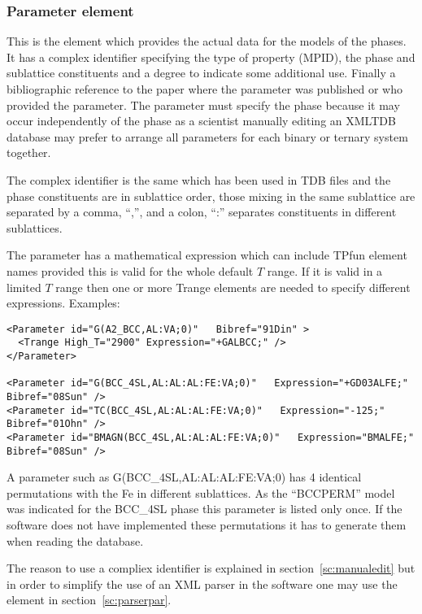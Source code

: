 \documentclass[12pt]{article}
\begin{document}
\begin{appendices}
\subsubsection{Parameter element}\label{sc:parameter}

This is the element which provides the actual data for the models of
the phases.  It has a complex identifier specifying the type of
property (MPID), the phase and sublattice constituents and a degree to
indicate some additional use.  Finally a bibliographic reference to
the paper where the parameter was published or who provided the
parameter.  The parameter must specify the phase because it may occur
independently of the phase as a scientist manually editing an XMLTDB
database may prefer to arrange all parameters for each binary or
ternary system together.

The complex identifier is the same which has been used in TDB files
and the phase constituents are in sublattice order, those mixing in
the same sublattice are separated by a comma, ``,'', and a colon,
``:'' separates constituents in different sublattices.

The parameter has a mathematical expression which can include TPfun
element names provided this is valid for the whole default $T$ range.
If it is valid in a limited $T$ range then one or more Trange elements
are needed to specify different expressions.  Examples:

{\small
\begin{verbatim}
<Parameter id="G(A2_BCC,AL:VA;0)"   Bibref="91Din" > 
  <Trange High_T="2900" Expression="+GALBCC;" />
</Parameter>

<Parameter id="G(BCC_4SL,AL:AL:AL:FE:VA;0)"   Expression="+GD03ALFE;" Bibref="08Sun" />
<Parameter id="TC(BCC_4SL,AL:AL:AL:FE:VA;0)"   Expression="-125;" Bibref="01Ohn" />
<Parameter id="BMAGN(BCC_4SL,AL:AL:AL:FE:VA;0)"   Expression="BMALFE;" Bibref="08Sun" />
\end{verbatim}
}

A parameter such as G(BCC\_4SL,AL:AL:AL:FE:VA;0) has 4 identical
permutations with the Fe in different sublattices.  As the ``BCCPERM''
model was indicated for the BCC\_4SL phase this parameter is listed
only once.  If the software does not have implemented these
permutations it has to generate them when reading the database.

The reason to use a compliex identifier is explained in
section~\ref{sc:manualedit} but in order to simplify the use of an XML
parser in the software one may use the element in
section~\ref{sc:parserpar}.



\end{appendices}
\end{document}

